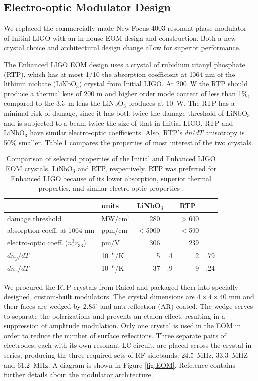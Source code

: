 \subsection{Electro-optic Modulator Design}
We replaced the commercially-made New Focus 4003 resonant phase
modulator of Initial LIGO with an in-house EOM design and
construction. Both a new crystal choice and architectural design
change allow for superior performance.

The Enhanced LIGO EOM design uses a crystal of rubidium titanyl
phosphate (RTP), which has at most 1/10 the absorption coefficient at
1064 nm of the lithium niobate (LiNbO$_3$) crystal from Initial
LIGO. At 200~W the RTP should produce a thermal lens of 200 m and
higher order mode content of less than 1\%, compared to the 3.3~m lens
the LiNbO$_3$ produces at 10~W. The RTP has a minimal risk of damage,
since it has both twice the damage threshold of LiNbO$_3$ and is
subjected to a beam twice the size of that in Initial LIGO. RTP and
LiNbO$_3$ have similar electro-optic coefficients. Also, RTP's $dn/dT$
anisotropy is 50\% smaller. Table \ref{tab:EOMcrystals} compares the
properties of most interest of the two crystals.

\begin{table}
\centering
\caption[Comparison of selected properties of the Initial and Enhanced
LIGO EOM crystals]{Comparison of selected properties of the Initial and Enhanced
  LIGO EOM crystals, LiNbO$_3$ and RTP, respectively. RTP was
  preferred for Enhanced LIGO because of its lower absorption,
  superior thermal properties, and similar 
  electro-optic properties \citep{UFLIGOGroup2006Upgrading}.}  
\begin{tabular}{l l r@{}l r@{}l}
\hline
 & units & \multicolumn{2}{l}{LiNbO$_3$} & \multicolumn{2}{l}{RTP} \\
\hline
damage threshold & MW/cm$^2$ & 280 & & $>$600 & \\
absorption coeff. at 1064 nm & ppm/cm & $<$5000 & & $<$500 & \\
electro-optic coeff. ($n_z^3 r_{33}$) & pm/V & 306 & & 239 & \\
$dn_y/dT$ & 10$^{-6}$/K & 5 & .4 & 2 & .79 \\
$dn_z/dT$ & 10$^{-6}$/K & 37 & .9 & 9 & .24 \\
\hline
\end{tabular}
\label{tab:EOMcrystals}
\end{table}

We procured the RTP crystals from Raicol and packaged them into
specially-designed, custom-built modulators. The crystal dimensions are
$4 \times 4 \times 40$ mm and their faces are wedged by $2.85^\circ$
and anti-reflection (AR) coated. The wedge serves to separate the
polarizations and prevents an etalon effect, resulting in a
suppression of amplitude modulation. Only one crystal is used in the
EOM in order to reduce the number of surface reflections. Three
separate pairs of electrodes, each with its own resonant LC circuit,
are placed across the crystal in series, producing the three required
sets of RF sidebands: 24.5~MHz, 33.3~MHZ and 61.2~MHz. A diagram is
shown in Figure \ref{fig:EOM}. Reference
\citep{Quetschke2008ElectroOptic} contains further details about the
modulator architecture.

